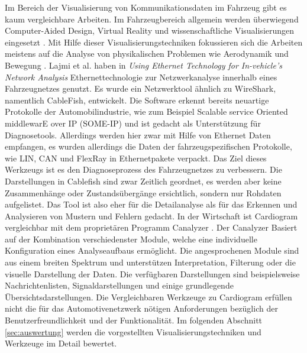 \documentclass[draft=false
              ,paper=a4
              ,twoside=false
              ,fontsize=11pt
              ,headsepline
              ,BCOR10mm
              ,DIV11
              ]{scrbook}
\begin{document}
Im Bereich der Visualisierung von Kommunikationsdaten im Fahrzeug gibt es kaum vergleichbare Arbeiten. Im Fahrzeugbereich allgemein werden überwiegend Computer-Aided Design, Virtual Reality und wissenschaftliche Visualisierungen eingesetzt \cite{stevens_visualization_2007}. Mit Hilfe dieser Visualisierungstechniken fokussieren sich die Arbeiten meistens auf die Analyse von physikalischen Problemen wie Aerodynamik und Bewegung \cite{konyha_interactive_2007}\cite{schulz_interactive_1999}. Lajmi et al. haben in \textit{Using Ethernet Technology for In-vehicle’s Network Analysis}  \cite{lajmi_using_2013} Ethernettechnologie zur Netzwerkanalyse innerhalb eines Fahrzeugnetzes genutzt. Es wurde ein Netzwerktool ähnlich zu WireShark, namentlich CableFish, entwickelt. Die Software erkennt bereits neuartige Protokolle der Automobilindustrie, wie zum Beispiel Scalable service Oriented middlewarE over IP (SOME-IP) \cite{someip_scalable_2014} und ist gedacht als Unterstützung für Diagnosetools. Allerdings werden hier zwar mit Hilfe von Ethernet Daten empfangen, es wurden allerdings die Daten der fahrzeugspezifischen Protokolle, wie LIN, CAN und FlexRay in Ethernetpakete verpackt. Das Ziel dieses Werkzeugs ist es den Diagnoseprozess des Fahrzeugnetzes zu verbessern. Die Darstellungen in Cablefish sind zwar Zeitlich geordnet, es werden aber keine Zusammenhänge oder Zustandsübergänge ersichtlich, sondern nur Rohdaten aufgelistet. Das Tool ist also eher für die Detailanalyse als für das Erkennen und Analysieren von Mustern und Fehlern gedacht. In der Wirtschaft ist Cardiogram vergleichbar mit dem proprietären Programm Canalyzer \cite{vector_2017}. Der Canalyzer Basiert auf der Kombination verschiedenster Module, welche eine individuelle Konfiguration eines Analyseaufbaus ermöglicht. Die angesprochenen Module sind aus einem breiten Spektrum und unterstützen Interpretation, Filterung oder die visuelle Darstellung der Daten. Die verfügbaren Darstellungen sind beispielsweise Nachrichtenlisten, Signaldarstellungen und einige grundlegende Übersichtsdarstellungen. 
Die Vergleichbaren Werkzeuge zu Cardiogram erfüllen nicht die für das Automotivenetzwerk nötigen Anforderungen bezüglich der Benutzerfreundlichkeit und der Funktionalität. Im folgenden Abschnitt \ref{sec:auswertung} werden die vorgestellten Visualisierungstechniken und Werkzeuge im Detail bewertet. 
\end{document}
